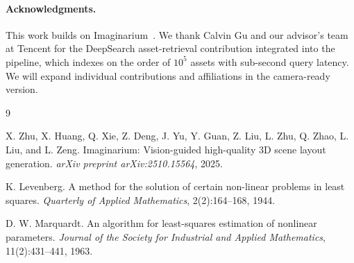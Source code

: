 \documentclass[10pt,twocolumn]{article}
\begin{document}
\paragraph{Acknowledgments.}
This work builds on Imaginarium~\cite{zhu2025imaginarium}.  We thank Calvin Gu
and our advisor's team at Tencent for the DeepSearch asset-retrieval
contribution integrated into the pipeline, which indexes on the order of $10^5$
assets with sub-second query latency.  We will expand individual contributions
and affiliations in the camera-ready version.

\begin{thebibliography}{9}

X. Zhu, X. Huang, Q. Xie, Z. Deng, J. Yu, Y. Guan, Z. Liu, L. Zhu,
Q. Zhao, L. Liu, and L. Zeng.
\newblock Imaginarium: Vision-guided high-quality 3D scene layout generation.
\newblock \emph{arXiv preprint arXiv:2510.15564}, 2025.

K. Levenberg.
\newblock A method for the solution of certain non-linear problems in least
squares.
\newblock \emph{Quarterly of Applied Mathematics}, 2(2):164--168, 1944.

D. W. Marquardt.
\newblock An algorithm for least-squares estimation of nonlinear parameters.
\newblock \emph{Journal of the Society for Industrial and Applied
Mathematics}, 11(2):431--441, 1963.

\end{thebibliography}
\end{document}
